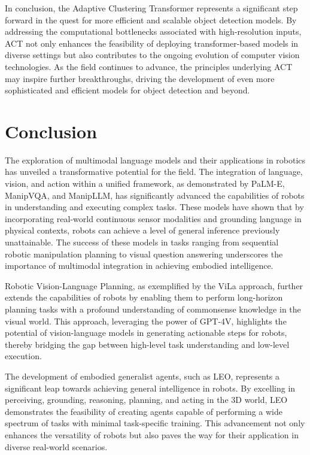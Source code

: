 \documentclass[a4paper]{article}
\begin{document}
In conclusion, the Adaptive Clustering Transformer represents a significant step forward in the quest for more efficient and scalable object detection models. By addressing the computational bottlenecks associated with high-resolution inputs, ACT not only enhances the feasibility of deploying transformer-based models in diverse settings but also contributes to the ongoing evolution of computer vision technologies. As the field continues to advance, the principles underlying ACT may inspire further breakthroughs, driving the development of even more sophisticated and efficient models for object detection and beyond.
\section{Conclusion}
The exploration of multimodal language models and their applications in robotics has unveiled a transformative potential for the field. The integration of language, vision, and action within a unified framework, as demonstrated by PaLM-E, ManipVQA, and ManipLLM, has significantly advanced the capabilities of robots in understanding and executing complex tasks. These models have shown that by incorporating real-world continuous sensor modalities and grounding language in physical contexts, robots can achieve a level of general inference previously unattainable. The success of these models in tasks ranging from sequential robotic manipulation planning to visual question answering underscores the importance of multimodal integration in achieving embodied intelligence.

Robotic Vision-Language Planning, as exemplified by the ViLa approach, further extends the capabilities of robots by enabling them to perform long-horizon planning tasks with a profound understanding of commonsense knowledge in the visual world. This approach, leveraging the power of GPT-4V, highlights the potential of vision-language models in generating actionable steps for robots, thereby bridging the gap between high-level task understanding and low-level execution.

The development of embodied generalist agents, such as LEO, represents a significant leap towards achieving general intelligence in robots. By excelling in perceiving, grounding, reasoning, planning, and acting in the 3D world, LEO demonstrates the feasibility of creating agents capable of performing a wide spectrum of tasks with minimal task-specific training. This advancement not only enhances the versatility of robots but also paves the way for their application in diverse real-world scenarios.
\end{document}
